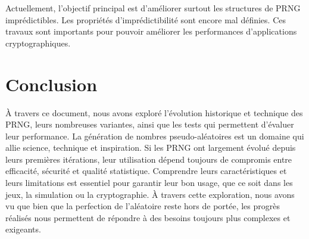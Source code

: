 \documentclass[9pt,a4paper,twoside,english]{class/backend}
\begin{document}
    Actuellement, l'objectif principal est d'améliorer surtout les structures de PRNG imprédictibles. Les propriétés d'imprédictibilité sont encore mal définies. Ces travaux sont importants pour pouvoir améliorer les performances d'applications cryptographiques.
    
    
    


\section{Conclusion}

\hspace{10pt}À travers ce document, nous avons exploré l'évolution historique et technique des PRNG, leurs nombreuses variantes, ainsi que les tests qui permettent d'évaluer leur performance. La génération de nombres pseudo-aléatoires est un domaine qui allie science, technique et inspiration. Si les PRNG ont largement évolué depuis leurs premières itérations, leur utilisation dépend toujours de compromis entre efficacité, sécurité et qualité statistique. Comprendre leurs caractéristiques et leurs limitations est essentiel pour garantir leur bon usage, que ce soit dans les jeux, la simulation ou la cryptographie. À travers cette exploration, nous avons vu que bien que la perfection de l'aléatoire reste hors de portée, les progrès réalisés nous permettent de répondre à des besoins toujours plus complexes et exigeants.



\printbibliography

\end{document}
